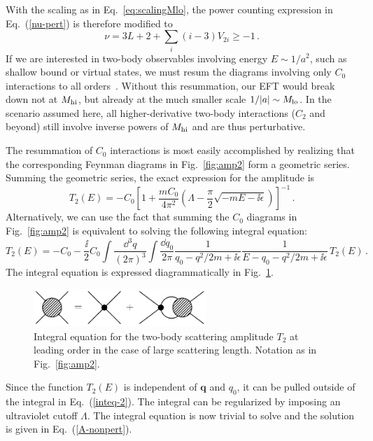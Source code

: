 With the scaling as in Eq.~\eqref{eq:scalingMlo}, the power counting expression 
in Eq.~(\ref{nu-pert}) is therefore modified to
\begin{equation}
 \nu=3L+2+\sum_i (i-3) V_{2i} \geq -1\,.
\end{equation}
If we are interested in two-body observables involving energy $E \sim 1/a^2$,
such as shallow bound or virtual states,
we must resum the diagrams involving only $C_0$ interactions
to all orders~\cite{vanKolck:1998bw,Kaplan:1998we}.  Without this resummation, 
our EFT would break down not at $M_{\rm hi}$, but already at the much smaller scale 
$1/|a|\sim M_{\rm lo}$.  In the scenario assumed here, all higher-derivative two-body 
interactions ($C_2$ and beyond) still involve inverse powers of $M_{\rm hi}$ and are 
thus perturbative.


The resummation of $C_0$ interactions is most easily accomplished by
realizing that
the corresponding Feynman diagrams in Fig.~\ref{fig:amp2}
form a geometric series. 
Summing the geometric series, the exact expression
for the amplitude is
\begin{equation}
 T_2(E) = {-}C_0 \left[ 1 + \frac{mC_0}{4 \pi^2}
 \left( \Lambda - \frac{\pi}{2} \sqrt {-mE -\ii\epsilon} \right) 
 \right]^{-1} \,.
\label{A-nonpert}
\end{equation}
Alternatively, we can use the fact that summing the $C_0$ diagrams in
Fig.~\ref{fig:amp2} is equivalent to solving the following
integral equation:
\begin{equation}
 T_2(E) = {-}C_0 - \frac{\ii}{2} C_0 \int \frac{\dd^3q}{(2\pi)^3}
 \int\frac{\dd q_0}{2\pi} \frac1{q_0 - q^2/2m + \ii \epsilon}
 \frac1{ E - q_0 - q^2/2m + \ii \epsilon} \, T_2 (E) \,.
\label{inteq-2}
\end{equation}
The integral equation is expressed diagrammatically in Fig.~\ref{fig:amp2b}.
\begin{figure}[htb]
\bigskip
\centerline{\includegraphics*[width=6.5cm,angle=0]{fig_feynC0int.pdf}}
\medskip
\caption
    {Integral equation  for the two-body scattering amplitude $T_2$
      at leading order in the case of large scattering length.
      Notation as in Fig.~\ref{fig:amp2}.}
\label{fig:amp2b}
\end{figure}
Since the function $T_2(E)$ is independent of ${\bm q}$ and $q_0$,
it can be pulled
outside of the integral in  Eq.~(\ref{inteq-2}). The integral can be
regularized by imposing an ultraviolet cutoff $\Lambda$.
The integral equation is now trivial to solve and the
solution is given in Eq.~(\ref{A-nonpert}).

